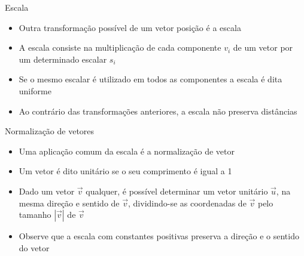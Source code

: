 \begin{frame}[fragile]{Escala}

    \begin{itemize}
        \item Outra transformação possível de um vetor posição é a escala
        \pause

        \item A escala consiste na multiplicação de cada componente $v_i$ de um vetor por um determinado escalar $s_i$
        \pause

        \item Se o mesmo escalar é utilizado em todos as componentes a escala é dita uniforme
        \pause

        \item Ao contrário das transformações anteriores, a escala não preserva distâncias
        \pause

    \end{itemize}

\end{frame}

\begin{frame}[fragile]{Normalização de vetores}

    \begin{itemize}
        \item Uma aplicação comum da escala é a normalização de vetor
        \pause

        \item Um vetor é dito unitário se o seu comprimento é igual a 1
        \pause

        \item Dado um vetor $\vec{v}$ qualquer, é possível determinar um vetor unitário 
            $\vec{u}$, na mesma direção e sentido de $\vec{v}$, dividindo-se as coordenadas de 
            $\vec{v}$ pelo tamanho $|\vec{v}|$ de $\vec{v}$
        \pause

        \item Observe que a escala com constantes positivas preserva a direção e o sentido do
            vetor
        \pause

    \end{itemize}

\end{frame}
